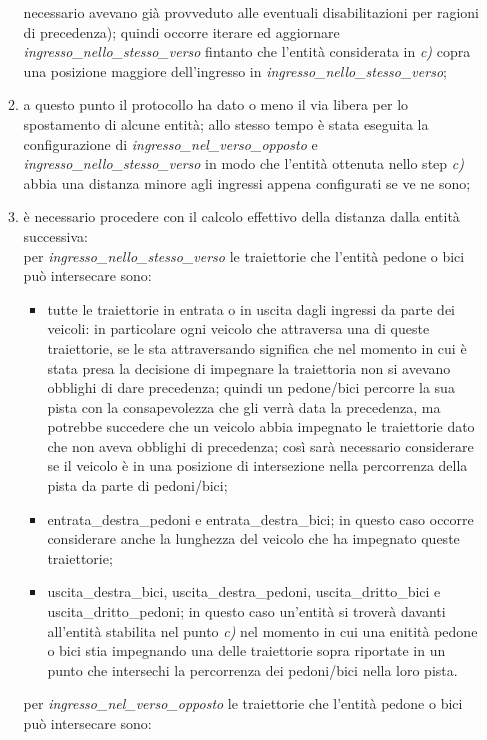 \begin{enumerate}
\begin{enumerate}
necessario avevano già provveduto alle eventuali disabilitazioni per ragioni di precedenza); quindi occorre iterare ed aggiornare \textit{ingres\-so\_nel\-lo\_stes\-so\_ver\-so} fintanto che l'entità considerata in \textit{c)} copra una posizione maggiore dell'ingresso in \textit{ingres\-so\_nel\-lo\_stes\-so\_ver\-so};
\item a questo punto il protocollo ha dato o meno il via libera per lo spostamento di alcune entità; allo stesso tempo è stata eseguita la configurazione di \textit{ingres\-so\_nel\_ver\-so\_op\-pos\-to} e \textit{ingres\-so\_nel\-lo\_stes\-so\_ver\-so} in modo che l'entità ottenuta nello step \textit{c)} abbia una distanza minore agli ingressi appena configurati se ve ne sono;
\item è necessario procedere con il calcolo effettivo della distanza dalla entità successiva:\\
per \textit{ingres\-so\_nel\-lo\_stes\-so\_ver\-so} le traiettorie che l'entità pedone o bici può intersecare sono:
\begin{itemize}
\item tutte le traiettorie in entrata o in uscita dagli ingressi da parte dei veicoli: in particolare ogni veicolo che attraversa una di queste traiettorie, se le sta attraversando significa che nel momento in cui è stata presa la decisione di impegnare la traiettoria non si avevano obblighi di dare precedenza; quindi un pedone/bici percorre la sua pista con la consapevolezza che gli verrà data la precedenza, ma potrebbe succedere che un veicolo abbia impegnato le traiettorie dato che non aveva obblighi di precedenza; così sarà necessario considerare se il veicolo è in una posizione di intersezione nella percorrenza della pista da parte di pedoni/bici; 
\item en\-tra\-ta\_des\-tra\_pe\-do\-ni e en\-tra\-ta\_des\-tra\_bi\-ci; in questo caso occorre considerare anche la lunghezza del veicolo che ha impegnato queste traiettorie;
\item usci\-ta\_des\-tra\_bi\-ci, usci\-ta\_des\-tra\_pe\-do\-ni, usci\-ta\_drit\-to\_bi\-ci e usci\-ta\_drit\-to\_pe\-do\-ni; in questo caso un'entità si troverà davanti all'entità stabilita nel punto \textit{c)} nel momento in cui una enitità pedone o bici stia impegnando una delle traiettorie sopra riportate in un punto che intersechi la percorrenza dei pedoni/bici nella loro pista.
\end{itemize}
per \textit{ingres\-so\_nel\_ver\-so\_op\-pos\-to} le traiettorie che l'entità pedone o bici può intersecare sono:

\end{enumerate}
\end{enumerate}
